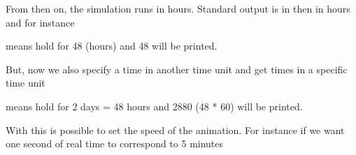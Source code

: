 \documentclass[letterpaper,10pt,english]{sphinxmanual}
\begin{document}
From then on, the simulation runs in hours. Standard output is in then in hours and for instance

\begin{sphinxVerbatim}[commandchars=\\\{\}]
 
  
\end{sphinxVerbatim}

means hold for 48 (hours) and 48 will be printed.

But, now we also specify a time in another time unit and get times in a specific time unit

\begin{sphinxVerbatim}[commandchars=\\\{\}]
 
  
\end{sphinxVerbatim}

means hold for 2 days = 48 hours and 2880 (48 * 60) will be printed.

With this is possible to set the speed of the animation. For instance if we want one second of real time to
correspond to 5 minutes

\begin{sphinxVerbatim}[commandchars=\\\{\}]
\end{sphinxVerbatim}
\end{document}
